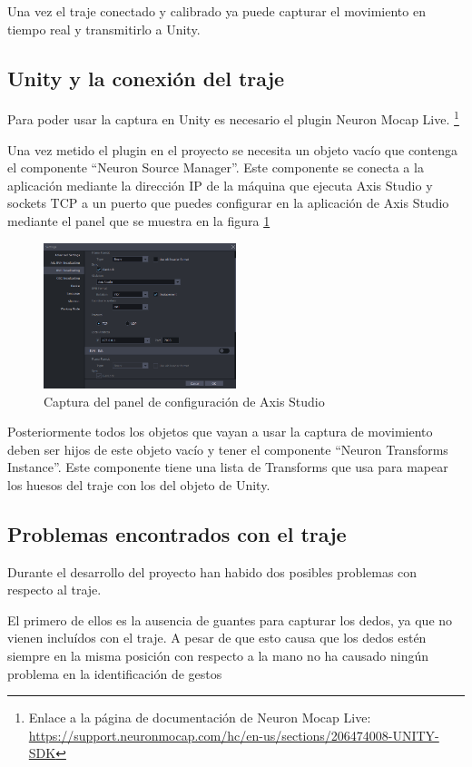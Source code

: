 Una vez el traje conectado y calibrado ya puede capturar el movimiento en tiempo real y transmitirlo a Unity.
\subsection{Unity y la conexión del traje}
\label{subsec:NeuronMocapLive}
Para poder usar la captura en Unity es necesario el plugin Neuron Mocap Live. \footnote{Enlace a la página de documentación de Neuron Mocap Live: \url{https://support.neuronmocap.com/hc/en-us/sections/206474008-UNITY-SDK}}

Una vez metido el plugin en el proyecto se necesita un objeto vacío que contenga el componente ``Neuron Source Manager''.
Este componente se conecta a la aplicación mediante la dirección IP de la máquina que ejecuta Axis Studio y sockets TCP a un puerto que puedes configurar en la aplicación de Axis Studio mediante el panel que se muestra en la figura \ref{fig:SettingAxis}

\begin{figure}[H]
	\centering
	\includegraphics[width=0.5\textwidth]{Imagenes/Bitmap/SettingsAxis.PNG}
	\caption{Captura del panel de configuración de Axis Studio}
	\label{fig:SettingAxis}
\end{figure}

Posteriormente todos los objetos que vayan a usar la captura de movimiento deben ser hijos de este objeto vacío y tener el componente ``Neuron Transforms Instance''.
Este componente tiene una lista de Transforms que usa para mapear los huesos del traje con los del objeto de Unity.

\subsection{Problemas encontrados con el traje}
Durante el desarrollo del proyecto han habido dos posibles problemas con respecto al traje.

El primero de ellos es la ausencia de guantes para capturar los dedos, ya que no vienen incluídos con el traje.
A pesar de que esto causa que los dedos estén siempre en la misma posición con respecto a la mano no ha causado ningún problema en la identificación de gestos

